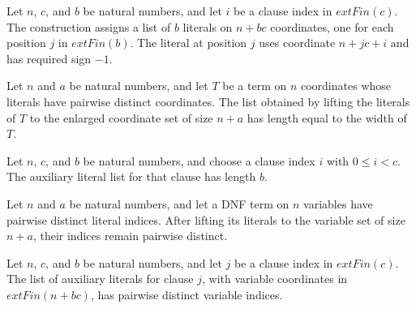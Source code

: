\begin{definition}
\label{FABL.tseitinAuxiliaryLiterals}
\leanok
{}
Let $n$, $c$, and $b$ be natural numbers, and let $i$ be a clause index in
$	ext{Fin}(c)$. The construction assigns a list of $b$ literals on $n+bc$ coordinates,
one for each position $j$ in $	ext{Fin}(b)$. The literal at position $j$ uses coordinate
$n+jc+i$ and has required sign $-1$.
\end{definition}

\begin{theorem}
\label{FABL.length_tseitinLiftLiterals}
\leanok
{}
Let $n$ and $a$ be natural numbers, and let $T$ be a term on $n$ coordinates whose
literals have pairwise distinct coordinates. The list obtained by lifting the literals
of $T$ to the enlarged coordinate set of size $n+a$ has length equal to the width of
$T$.
\end{theorem}

\begin{theorem}
\label{FABL.length_tseitinAuxiliaryLiterals}
\leanok
{}
Let $n$, $c$, and $b$ be natural numbers, and choose a clause index $i$ with $0 \le i <
c$. The auxiliary literal list for that clause has length $b$.
\end{theorem}

\begin{theorem}
\label{FABL.nodupIndices_tseitinLiftLiterals}
\leanok
{}
Let $n$ and $a$ be natural numbers, and let a DNF term on $n$ variables have pairwise
distinct literal indices. After lifting its literals to the variable set of size $n+a$,
their indices remain pairwise distinct.
\end{theorem}

\begin{theorem}
\label{FABL.nodupIndices_tseitinAuxiliaryLiterals}
\leanok
{}
Let $n$, $c$, and $b$ be natural numbers, and let $j$ be a clause index in
$	ext{Fin}(c)$. The list of auxiliary literals for clause $j$, with variable coordinates
in $	ext{Fin}(n+b c)$, has pairwise distinct variable indices.
\end{theorem}

